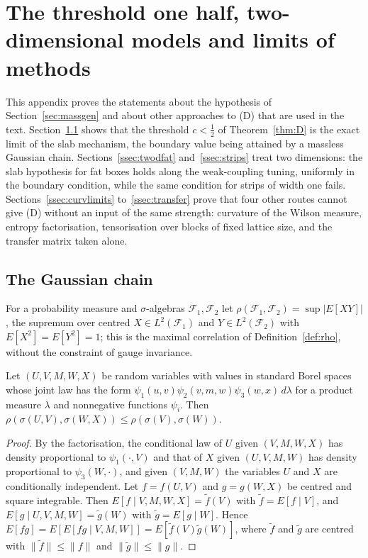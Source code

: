 \section{The threshold one half, two-dimensional models and limits of methods}
\label{app:obstructions}

This appendix proves the statements about the hypothesis of
Section~\ref{sec:massgen} and about other approaches to (D) that are used in
the text. Section~\ref{ssec:gausschain} shows that the threshold $c<\frac12$ of
Theorem~\ref{thm:D} is the exact limit of the slab mechanism, the boundary value
being attained by a massless Gaussian chain. Sections~\ref{ssec:twodfat}
and~\ref{ssec:strips} treat two dimensions: the slab hypothesis for fat boxes
holds along the weak-coupling tuning, uniformly in the boundary condition, while
the same condition for strips of width one fails. Sections~\ref{ssec:curvlimits}
to~\ref{ssec:transfer} prove that four other routes cannot give (D) without an
input of the same strength: curvature of the Wilson measure, entropy
factorisation, tensorisation over blocks of fixed lattice size, and the
transfer matrix taken alone.

\subsection{The Gaussian chain}\label{ssec:gausschain}

For a probability measure and $\sigma$-algebras $\mathcal F_1,\mathcal F_2$ let
$\rho(\mathcal F_1,\mathcal F_2)=\sup|E[XY]|$, the supremum over centred $X\in
L^2(\mathcal F_1)$ and $Y\in L^2(\mathcal F_2)$ with $E[X^2]=E[Y^2]=1$; this is
the maximal correlation of Definition~\ref{def:rho}, without the constraint of
gauge invariance.

\begin{lemma}\label{lem:gmarkov}
Let $(U,V,M,W,X)$ be random variables with values in standard Borel spaces whose
joint law has the form $\psi_1(u,v)\psi_2(v,m,w)\psi_3(w,x)\,d\lambda$ for a
product measure $\lambda$ and nonnegative functions $\psi_i$. Then
$\rho(\sigma(U,V),\sigma(W,X))\le\rho(\sigma(V),\sigma(W))$.
\end{lemma}

\begin{proof}
By the factorisation, the conditional law of $U$ given $(V,M,W,X)$ has density
proportional to $\psi_1(\cdot,V)$ and that of $X$ given $(U,V,M,W)$ has density
proportional to $\psi_3(W,\cdot)$, and given $(V,M,W)$ the variables $U$ and
$X$ are conditionally independent. Let $f=f(U,V)$ and $g=g(W,X)$ be centred and
square integrable. Then $E[f\mid V,M,W,X]=\tilde f(V)$ with $\tilde f=E[f\mid
V]$, and $E[g\mid U,V,M,W]=\tilde g(W)$ with $\tilde g=E[g\mid W]$. Hence
$E[fg]=E[E[fg\mid V,M,W]]=E[\tilde f(V)\tilde g(W)]$, where $\tilde f$ and
$\tilde g$ are centred with $\|\tilde f\|\le\|f\|$ and $\|\tilde g\|\le\|g\|$.
\end{proof}

